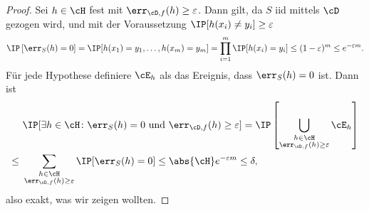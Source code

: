\documentclass[language=ngerman,algolist,acrolist]{TemplateLecture}
\begin{document}
\begin{proof}
    Sei $h \in \cH$ fest mit $\err_{\cD, f}(h) \geq \varepsilon$. Dann gilt, da $S$ \ac{iid} mittels $\cD$ gezogen wird, und mit der Voraussetzung $\IP[h(x_i) \neq y_i] \geq \varepsilon$
    \begin{equation*}
        \IP\left[ \err_S(h) = 0 \right] = \IP[h(x_1) = y_1, \ldots, h(x_m) = y_m] = \prod_{i = 1}^m \IP[h(x_i) = y_i] \leq (1 - \varepsilon)^m \leq e^{-\varepsilon m}.
    \end{equation*}
    Für jede Hypothese definiere $\cE_h$ als das Ereignis, dass $\err_S(h) = 0$ ist. Dann ist 
    \begin{equation*}
        \begin{split}
            &\IP[\exists h \in \cH \colon \text{$\err_S(h) = 0$ und $\err_{\cD, f}(h) \geq \varepsilon$}] = \IP\left[ \bigcup_{\substack{h \in \cH \\ \err_{\cD, f}(h) \geq \varepsilon}}  \cE_h \right]  \\
            \leq~& \sum_{\substack{h \in \cH \\ \err_{\cD, f}(h) \geq \varepsilon}} \IP[\err_S(h) = 0] \leq \abs{\cH} e^{-\varepsilon m} \leq \delta,
        \end{split}
    \end{equation*}
    also exakt, was wir zeigen wollten.
\end{proof}
\end{document}
